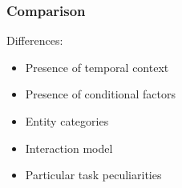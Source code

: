 \begin{frame}
\frametitle{Comparison}
    Differences:
    \begin{itemize}
        \item<1-5> Presence of temporal context
        \item<2-5> Presence of conditional factors
        \item<3-5> Entity categories
        \item<4-5> Interaction model
        \item<5> Particular task peculiarities
    \end{itemize}
\end{frame}
